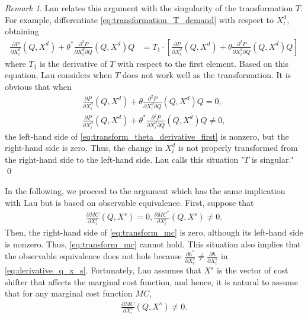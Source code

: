 \documentclass[11pt, a4paper]{article}
\theoremstyle{remark}
\newtheorem{remark}{Remark}
\begin{document}

\begin{remark}
    Lau relates this argument with the singularity of the transformation $T$.
For example, differentiate \eqref{eq:transformation_T_demand} with respect to $X^{d}_i$, obtaining
\begin{align}
\frac{\partial P}{\partial X^{d}_i}(Q, X^{d}) + \theta^{*}\frac{\partial^2 P}{\partial X^{d}_i \partial Q}(Q, X^{d})Q &= T_{1} \cdot \left[\frac{\partial P}{\partial X^{d}_i}(Q, X^{d}) + \theta \frac{\partial^2 P}{\partial X^{d}_i \partial Q}(Q, X^{d})Q\right]\label{eq:transform_theta_derivative_first}
\end{align}
where $T_1$ is the derivative of $T$ with respect to the first element.
Based on this equation, Lau considers when $T$ does not work well as the transformation.
It is obvious that when 
\begin{align}
    \frac{\partial P}{\partial X^{d}_{i}}(Q, X^{d}) + \theta \frac{\partial^2 P}{\partial X^{d}_{i}\partial Q}(Q, X^{d})Q = 0,\\
    \frac{\partial P}{\partial X^{d}_{i}}(Q, X^{d}) + \theta^{*} \frac{\partial^2 P}{\partial X^{d}_{i}\partial Q}(Q, X^{d})Q \ne 0,
\end{align}
the left-hand side of \eqref{eq:transform_theta_derivative_first} is nonzero, but the right-hand side is zero.
Thus, the change in $X_{i}^d$ is not properly transformed from the right-hand side to the left-hand side.
Lau calls this situation "$T$ is singular."
\qed
\end{remark}



In the following, we proceed to the argument which has the same implication with Lau but is based on observable equivalence.
First, suppose that
\begin{align}
    \frac{\partial MC}{\partial X_i^{s}}(Q, X^{s}) = 0, \frac{\partial MC^{*}}{\partial X_i^{s}}(Q, X^{s}) \ne 0.
\end{align}
Then, the right-hand side of \eqref{eq:transform_mc} is zero, although its left-hand side is nonzero.
Thus, \eqref{eq:transform_mc} cannot hold.
This situation also implies that the observable equivalence does not hols because $\frac{\partial h^{*}}{\partial X^{s}_{i}}  \ne \frac{\partial h}{\partial X^{s}_{i}}$ in \eqref{eq:derivative_q_x_s}.
Fortunately, Lau assumes that $X^{s}$ is the vector of cost shifter that affects the marginal cost function, and hence, it is natural to assume that for any marginal cost function $MC$, 
\begin{align}
    \frac{\partial MC}{\partial X_i^{s}}(Q, X^{s}) \ne 0.
\end{align}
\end{document}
